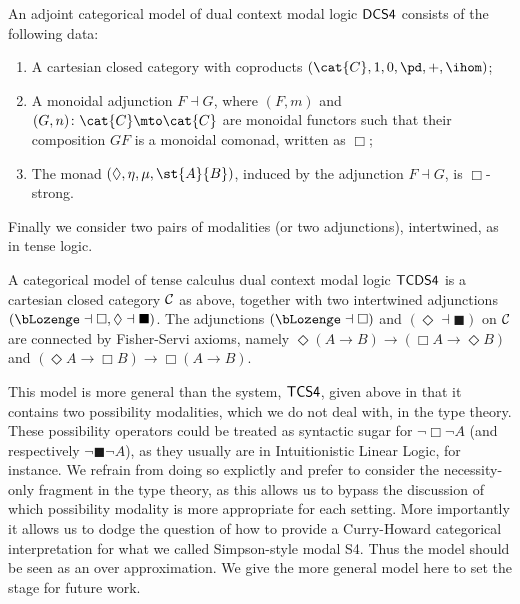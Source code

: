 \begin{definition}
  \label{def:CS4-single-adjoint-cat-model}
  An adjoint categorical model of dual context modal logic $\sf{DCS4}$
  consists of the following data:
  \begin{enumerate}
  \item A cartesian closed category with coproducts
    $(\cat{C},1,0,\pd,+,\ihom)$;
  \item 
    A monoidal adjunction $F \dashv G$, where $(F,m)$ and $(G,n)\colon
    \cat{C} \mto \cat{C}$ are monoidal functors such that their
    composition $GF$ is a monoidal comonad, written as $\Box$;
 \item The  monad $(\Diamond, \eta, \mu, \st{A}{B})$, induced by the adjunction $F \dashv G$,   is $\Box$-strong.
  \end{enumerate}
\end{definition}

Finally we consider two pairs of modalities (or two adjunctions),
intertwined, as in tense logic.

\begin{definition}
A categorical model of tense calculus dual context modal logic
$\sf{TCDS4}$ is a cartesian closed category $\cal{C}$ as above,
together with two intertwined adjunctions $(\bLozenge\dashv \Box,
\Diamond\dashv \blacksquare)$.  The adjunctions $(\bLozenge\dashv
\Box)$ and $(\Diamond\dashv \blacksquare)$ on $\cal{C}$ are connected
by Fisher-Servi axioms, namely $\Diamond (A\to B)\to (\Box A\to
\Diamond B)$ and $(\Diamond A\to \Box B)\to \Box (A\to B)$.
\end{definition}

This model is more general than the system, $\sf{TCS4}$, given above
in that it contains two possibility modalities, which we do not deal
with, in the type theory. These possibility operators could be treated
as syntactic sugar for $\neg \Box \neg A$ (and respectively $\neg
\blacksquare \neg A$), as they usually are in Intuitionistic Linear
Logic, for instance. We refrain from doing so explictly and prefer to
consider the necessity-only fragment in the type theory, as this
allows us to bypass the discussion of which possibility modality is
more appropriate for each setting.  More importantly it allows us to
dodge the question of how to provide a Curry-Howard categorical
interpretation for what we called Simpson-style modal S4.  Thus the
model should be seen as an over approximation.  We give the more
general model here to set the stage for future work.

